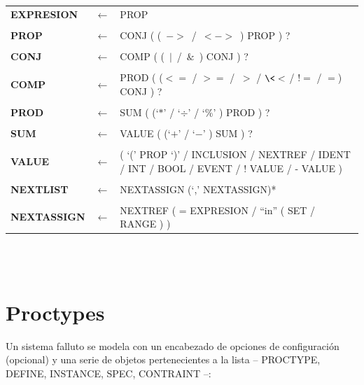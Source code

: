 \documentclass[titlepage, 12pt]{book}
\begin{document}
\begin{tabularx}{\textwidth}{>{\bfseries}llX }

EXPRESION & $\longleftarrow$ & PROP\\\\
PROP & $\longleftarrow$ & CONJ ( (~$->$~/~$<->$~) PROP ) ?\\\\
CONJ & $\longleftarrow$ & COMP ( (~$|$~/~$\&$~) CONJ ) ?\\\\
COMP & $\longleftarrow$ & PROD ( ($<=$ / $>=$ / $\>>$ / $\<<$ / $!=$ / $=$) CONJ ) ?\\\\
PROD & $\longleftarrow$ & SUM ( (`$*$' / `$\div$' / `$\%$' ) PROD ) ?\\\\
SUM & $\longleftarrow$ & VALUE ( (`$+$' / `$-$' ) SUM ) ?\\\\
VALUE & $\longleftarrow$  & ( `(' PROP `)' / INCLUSION / NEXTREF / IDENT / INT / BOOL / EVENT / ! VALUE / - VALUE ) \\\\
NEXTLIST & $\longleftarrow$  & NEXTASSIGN (`,' NEXTASSIGN)*\\\\
NEXTASSIGN & $\longleftarrow$  & NEXTREF ( = EXPRESION / ``in'' ( SET / RANGE ) )\\
\end{tabularx}
~\\\\




\section{Proctypes}
Un sistema falluto se modela con un encabezado de opciones de configuraci\'on (opcional) y una serie de objetos pertenecientes a la lista -- PROCTYPE, DEFINE, INSTANCE, SPEC, CONTRAINT --:\\\\
\end{document}
